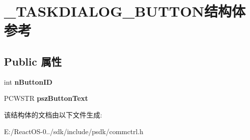 \hypertarget{struct___t_a_s_k_d_i_a_l_o_g___b_u_t_t_o_n}{}\section{\+\_\+\+T\+A\+S\+K\+D\+I\+A\+L\+O\+G\+\_\+\+B\+U\+T\+T\+O\+N结构体 参考}
\label{struct___t_a_s_k_d_i_a_l_o_g___b_u_t_t_o_n}
\subsection*{Public 属性}
\begin{DoxyCompactItemize}
\item 
\mbox{\label{struct___t_a_s_k_d_i_a_l_o_g___b_u_t_t_o_n_ae3bcd8e3d5f6103657e14e942dea46e3}} 
int {\bfseries n\+Button\+ID}
\item 
\mbox{\label{struct___t_a_s_k_d_i_a_l_o_g___b_u_t_t_o_n_a8596255bcf6319995a29e357995d770e}} 
P\+C\+W\+S\+TR {\bfseries psz\+Button\+Text}
\end{DoxyCompactItemize}


该结构体的文档由以下文件生成\+:\begin{DoxyCompactItemize}
\item 
E\+:/\+React\+O\+S-\/0../sdk/include/psdk/commctrl.\+h\end{DoxyCompactItemize}
